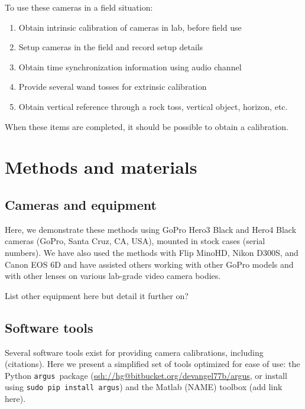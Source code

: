 \documentclass[fleqn,10pt]{wlpeerj}
\makeatletter
\newcommand{\argus}{\texttt{argus}}
\newcommand{\pipcommand}{\texttt{sudo pip install argus}}
\newcommand{\argusrepo}{\url{ssh://hg@bitbucket.org/devangel77b/argus}}
\newcommand{\matlabtoolbox}{add link here}
\makeatother
\begin{document}
To use these cameras in a field situation:
\begin{enumerate}
\item{Obtain intrinsic calibration of cameras in lab, before field use}
\item{Setup cameras in the field and record setup details}
\item{Obtain time synchronization information using audio channel}
\item{Provide several wand tosses for extrinsic calibration}
\item{Obtain vertical reference through a rock toss, vertical object, horizon, etc.}
\end{enumerate}

When these items are completed, it should be possible to obtain a calibration.  

\section*{Methods and materials}
\subsection*{Cameras and equipment}
Here, we demonstrate these methods using GoPro Hero3 Black and Hero4 Black cameras (GoPro, Santa Cruz, CA, USA), mounted in stock cases (serial numbers).  We have also used the methods with Flip MinoHD, Nikon D300S, and Canon EOS 6D and have assisted others working with other GoPro models and with other lenses on various lab-grade video camera bodies.

List other equipment here but detail it further on?

\subsection*{Software tools}
Several software tools exist for providing camera calibrations, including (citations).  Here we present a simplified set of tools optimized for ease of use: the Python \argus\ package (\argusrepo, or install using \pipcommand) and the Matlab (NAME) toolbox (\matlabtoolbox). %
\end{document}
